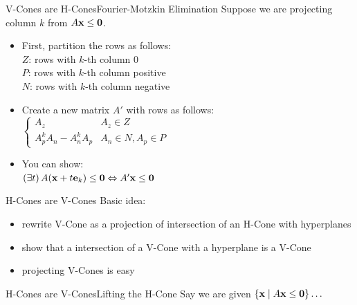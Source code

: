 \documentclass{beamer}
\begin{document}
\begin{frame}{V-Cones are H-Cones}{Fourier-Motzkin Elimination}
	Suppose we are projecting column $k$ from $A\mathbf{x}\leq\mathbf{0}$.
	\begin{itemize}
		\item<2-> First, partition the rows as follows:\\
		      $Z$: rows with $k$-th column $0$ \\
		      $P$: rows with $k$-th column positive\\
		      $N$: rows with $k$-th column negative
		\item<3-> Create a new matrix $A'$ with rows as follows: \\[5pt]
		      $\begin{cases}
				      A_z                   & A_z \in Z            \\
				      A_p^k A_n - A_n^k A_p & A_n \in N, A_p \in P
			      \end{cases}$
		\item<4-> You can show:\\
		      $(\exists t)\,A(\mathbf{x}+t\mathbf{e}_k) \leq \mathbf{0} \Leftrightarrow A'\mathbf{x}\leq\mathbf{0}$
	\end{itemize}
\end{frame}

\begin{frame}{H-Cones are V-Cones}
	Basic idea:
	\begin{itemize}
		\item rewrite V-Cone as a projection of intersection of an H-Cone with hyperplanes
		\item show that a intersection of a V-Cone with a hyperplane is a V-Cone
		\item projecting V-Cones is easy
	\end{itemize}
\end{frame}

\begin{frame}[t]{H-Cones are V-Cones}{Lifting the H-Cone}
	Say we are given $\left\{\mathbf{x}\;|\; A\mathbf{x}\leq\mathbf{0}\right\}\ldots$
	\medskip
	\begin{itemize}
	\end{itemize}
\end{frame}
\end{document}
